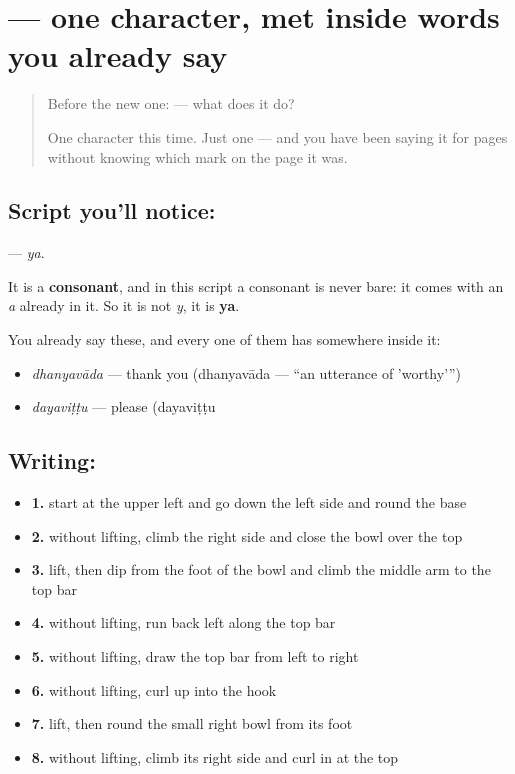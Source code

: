 \section[\texorpdfstring{\kn{ಯ} (ya)}{ಯ (ya)}]{ — one character, met inside words you already say}

\label{lesson:KA-S117-letter-ya}



\begin{quote}
Before the new one:  — what does it do?

One character this time. Just one — and you have been saying it for pages without knowing which mark on the page it was.
\end{quote}

\subsection*{Script you'll notice: }
\textbf{} — \emph{ya}.

It is a \textbf{consonant}, and in this script a consonant is never bare: it comes with an \emph{a} already in it. So it is not \emph{y}, it is \textbf{ya}.

You already say these, and every one of them has  somewhere inside it:

\begin{itemize}
\raggedright
  \item \textbf{} \emph{dhanyavāda} — thank you (dhanyavāda — \textquotedblleft{}an utterance of 'worthy'\textquotedblright{})
  \item \textbf{} \emph{dayaviṭṭu} — please (dayaviṭṭu
\end{itemize}

\subsection*{Writing: }

\begin{itemize}
\raggedright
  \item \textbf{1.} start at the upper left and go down the left side and round the base
  \item \textbf{2.} without lifting, climb the right side and close the bowl over the top
  \item \textbf{3.} lift, then dip from the foot of the bowl and climb the middle arm to the top bar
  \item \textbf{4.} without lifting, run back left along the top bar
  \item \textbf{5.} without lifting, draw the top bar from left to right
  \item \textbf{6.} without lifting, curl up into the hook
  \item \textbf{7.} lift, then round the small right bowl from its foot
  \item \textbf{8.} without lifting, climb its right side and curl in at the top
\end{itemize}

